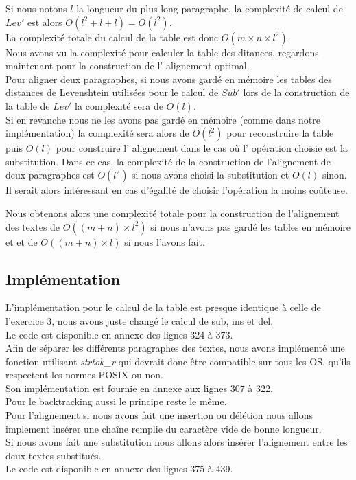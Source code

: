 \documentclass{article}
\begin{document}
Si nous notons $l$ la longueur du plus long paragraphe, la complexité de calcul
de $Lev'$ est alors $O(l^2+l+l) = O(l^2)$.\\
La complexité totale du calcul de la table est donc $O(m \times n \times l^2)$.\\

Nous avons vu la complexité pour calculer la table des ditances, regardons
maintenant pour la construction de l' alignement optimal.\\
Pour aligner deux paragraphes, si nous avons gardé en mémoire les tables des
distances de Levenshtein utilisées pour le calcul de $Sub'$ lors de la
construction de la table de $Lev'$ la complexité sera de $O(l)$.\\
Si en revanche nous ne les avons pas gardé en mémoire (comme dans notre
implémentation) la complexité sera alors de $O(l^2)$ pour reconstruire la table
puis $O(l)$ pour construire l' alignement dans le cas où l' opération choisie
est la substitution. Dans ce cas, la complexité de la construction de
l'alignement de deux paragraphes est $O(l^2)$ si nous avons choisi la
substitution et $O(l)$ sinon. Il serait alors intéressant en cas d'égalité de
choisir l'opération la moins coûteuse.

Nous obtenons alors une complexité totale pour la construction de l'alignement 
des textes de $O((m+n)\times l^2)$ si nous n'avons pas gardé les tables en
mémoire et et de $O((m+n)\times l)$ si nous l'avons fait.


\subsection{Implémentation}

L'implémentation pour le calcul de la table est presque identique à celle de
l'exercice 3, nous avons juste changé le calcul de sub, ins et del.\\
Le code est disponible en annexe des lignes 324 à 373.\\
Afin de séparer les différents paragraphes des textes, nous avons implémenté
une fonction utilisant \textit{strtok\_r} qui devrait donc être compatible sur tous les
OS, qu'ils respectent les normes POSIX ou non.\\
Son implémentation est fournie en annexe aux lignes 307 à 322.\\

Pour le backtracking aussi le principe reste le même.\\
Pour l'alignement si nous avons fait une insertion ou délétion nous allons
implement insérer une chaîne remplie du caractère vide de bonne longueur.\\
Si nous avons fait une substitution nous allons alors insérer l'alignement
entre les deux textes substitués.\\
Le code est disponible en annexe des lignes 375 à 439.\\
\end{document}
